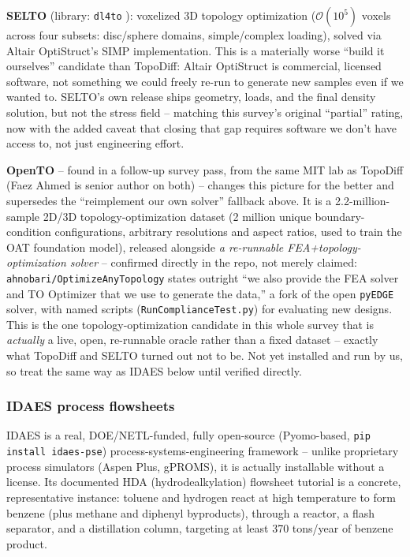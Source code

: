 \documentclass[11pt]{article}
\begin{document}
\textbf{SELTO} \citep{dittmer2022selto} (library: \texttt{dl4to}
\citep{erzmann2023dl4to}): voxelized 3D topology optimization
($\mathcal{O}(10^5)$ voxels across four subsets: disc/sphere domains,
simple/complex loading), solved via Altair OptiStruct's SIMP
implementation. This is a materially worse ``build it ourselves''
candidate than TopoDiff: Altair OptiStruct is commercial, licensed
software, not something we could freely re-run to generate new samples
even if we wanted to. SELTO's own release ships geometry, loads, and the
final density solution, but not the stress field -- matching this
survey's original ``partial'' rating, now with the added caveat that
closing that gap requires software we don't have access to, not just
engineering effort.

\textbf{OpenTO} \citep{nobari2025openTO} -- found in a follow-up survey
pass, from the same MIT lab as TopoDiff (Faez Ahmed is senior author on
both) -- changes this picture for the better and supersedes the
``reimplement our own solver'' fallback above. It is a 2.2-million-sample
2D/3D topology-optimization dataset (2 million unique boundary-condition
configurations, arbitrary resolutions and aspect ratios, used to train
the OAT foundation model), released alongside \emph{a re-runnable
FEA+topology-optimization solver} -- confirmed directly in the repo,
not merely claimed: \texttt{ahnobari/OptimizeAnyTopology} states outright
``we also provide the FEA solver and TO Optimizer that we use to generate
the data,'' a fork of the open \texttt{pyEDGE} solver, with named scripts
(\texttt{RunComplianceTest.py}) for evaluating new designs. This is the
one topology-optimization candidate in this whole survey that is
\emph{actually} a live, open, re-runnable oracle rather than a fixed
dataset -- exactly what TopoDiff and SELTO turned out not to be. Not yet
installed and run by us, so treat the same way as IDAES below until
verified directly.

\subsubsection{IDAES process flowsheets}
\label{sec:idaes}

IDAES \citep{lee2021idaes} is a real, DOE/NETL-funded, fully open-source
(Pyomo-based, \texttt{pip install idaes-pse}) process-systems-engineering
framework -- unlike proprietary process simulators (Aspen Plus, gPROMS),
it is actually installable without a license. Its documented HDA
(hydrodealkylation) flowsheet tutorial is a concrete, representative
instance: toluene and hydrogen react at high temperature to form benzene
(plus methane and diphenyl byproducts), through a reactor, a flash
separator, and a distillation column, targeting at least 370 tons/year of
benzene product.
\end{document}
